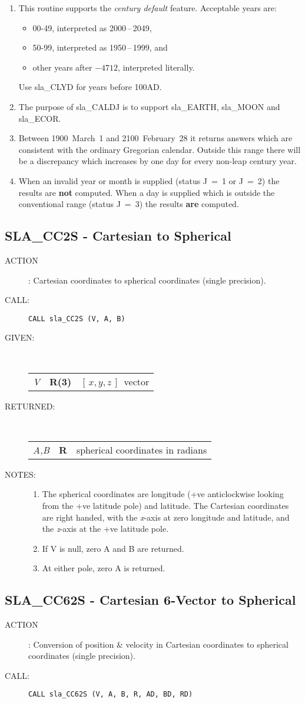 \documentclass[11pt,twoside]{article}
\newcommand{\xlabel}[1]{}
\newcommand{\xyz}       {$[\,x,y,z\,]$}
\newcommand{\routine}[3]
{\hbadness=10000
  \vbox
  {
    \rule{\textwidth}{0.3mm}\\
    {\Large {\bf #1} \hfill #2 \hfill {\bf #1}}\\
    \setlength{\oldspacing}{\topsep}
    \setlength{\topsep}{0.3ex}
    \begin{description}
      #3
    \end{description}
    \setlength{\topsep}{\oldspacing}
  }
}
\renewcommand{\routine}[3]
   {
      \subsection{#1\xlabel{#1} - #2\label{#1}}
       \begin{description}
         #3
       \end{description}
   }
\newcommand{\action}[1]
{\item[ACTION]: #1}
\newcommand{\action}[1]
   {\item[ACTION:] #1}
\newcommand{\call}[1]
{\item[CALL]: \hspace{0.4em}{\tt #1}}
\newlength{\oldspacing}
\renewcommand{\call}[1]
   {
    \item[CALL:] {\tt #1}
   }
\newcommand{\args}[2]
{
  \goodbreak
  \setlength{\oldspacing}{\topsep}
  \setlength{\topsep}{0.3ex}
  \begin{description}
  \item[#1]:\\[1.5ex]
    \begin{tabular}{p{7em}p{6em}p{22em}}
      #2
    \end{tabular}
  \end{description}
  \setlength{\topsep}{\oldspacing}
}
\renewcommand{\args}[2]
   {
     \begin{description}
        \item[#1:]\\
        \begin{tabular}{p{7em}p{6em}l}
           #2
        \end{tabular}
     \end{description}
   }
\newcommand{\spec}[3]
{
  {\em {#1}} & {\bf \mbox{#2}} & {#3}
}
\newcommand{\notes}[1]
{
  \goodbreak
  \setlength{\oldspacing}{\topsep}
  \setlength{\topsep}{0.3ex}
  \begin{description}
    \item[NOTES]:
        #1
  \end{description}
  \setlength{\topsep}{\oldspacing}
}
\renewcommand{\notes}[1]
   {
      \begin{description}
         \item[NOTES:]
            #1
      \end{description}
   }
\begin{document}
{
 \begin{enumerate}
  \item This routine supports the {\it century default}\/ feature.
        Acceptable years are:
        \begin{itemize}
         \item 00-49, interpreted as 2000\,--\,2049,
         \item 50-99, interpreted as 1950\,--\,1999, and
         \item other years after $-4712$, interpreted literally.
        \end{itemize}
        Use sla\_CLYD for years before 100AD.
  \item The purpose of sla\_CALDJ is to support
        sla\_EARTH, sla\_MOON and sla\_ECOR.
  \item Between 1900~March~1 and 2100~February~28 it returns answers
        which are consistent with the ordinary Gregorian calendar.
        Outside this range there will be a discrepancy which increases
        by one day for every non-leap century year.
  \item When an invalid year or month is supplied (status J~=~1 or J~=~2)
        the results are {\bf not} computed.  When a day is
        supplied which is outside the conventional range (status J~=~3)
        the results {\bf are} computed.
 \end{enumerate}
}
\routine{SLA\_CC2S}{Cartesian to Spherical}
{
 \action{Cartesian coordinates to spherical coordinates (single precision).}
 \call{CALL sla\_CC2S (V, A, B)}
}
\args{GIVEN}
{
 \spec{V}{R(3)}{\xyz\ vector}
}
\args{RETURNED}
{
 \spec{A,B}{R}{spherical coordinates in radians}
}
\notes
{
 \begin{enumerate}
  \item The spherical coordinates are longitude (+ve anticlockwise
        looking from the +ve latitude pole) and latitude.  The
        Cartesian coordinates are right handed, with the {\it x}-axis
        at zero longitude and latitude, and the {\it z}-axis at the
        +ve latitude pole.
  \item If V is null, zero A and B are returned.
  \item At either pole, zero A is returned.
 \end{enumerate}
}
\routine{SLA\_CC62S}{Cartesian 6-Vector to Spherical}
{
 \action{Conversion of position \& velocity in Cartesian coordinates
         to spherical coordinates (single precision).}
 \call{CALL sla\_CC62S (V, A, B, R, AD, BD, RD)}
}
\end{document}
